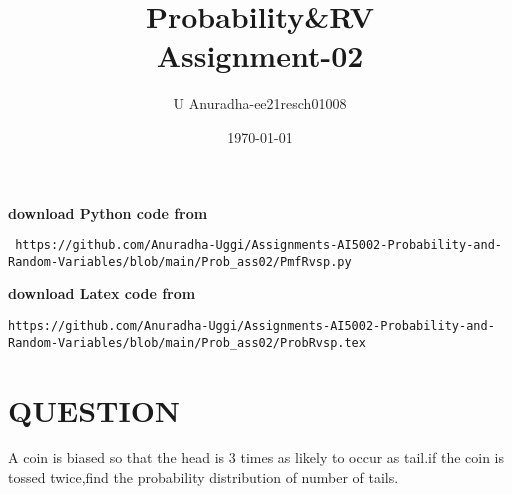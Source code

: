 \documentclass[journal,12pt,twocolumn]{IEEEtran}
\title{Probability\&RV \\ Assignment-02}
\author{U Anuradha-ee21resch01008}
\date{\today}
\begin{document}
\maketitle
\newpage
\bigskip
\renewcommand{\thefigure}{\theenumi}
\renewcommand{\thetable}{\theenumi}
\textbf{download Python code from}
\begin{lstlisting}
 https://github.com/Anuradha-Uggi/Assignments-AI5002-Probability-and-Random-Variables/blob/main/Prob_ass02/PmfRvsp.py
\end{lstlisting}
\textbf{download Latex code from}
\begin{lstlisting}
https://github.com/Anuradha-Uggi/Assignments-AI5002-Probability-and-Random-Variables/blob/main/Prob_ass02/ProbRvsp.tex
\end{lstlisting}
\section{QUESTION}
A coin is biased so that the head is 3 times as likely to occur as tail.if the coin is tossed twice,find the probability distribution of number of tails. \\
\end{document}
